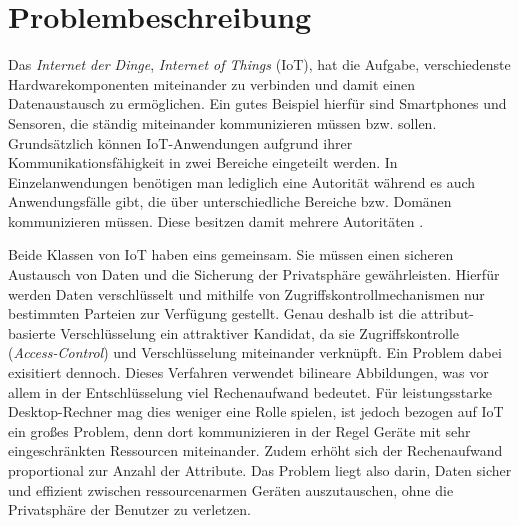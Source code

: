 \section{Problembeschreibung}
Das \textit{Internet der Dinge}, \textit{Internet of Things} (IoT), hat die
Aufgabe, verschiedenste Hardwarekomponenten miteinander zu verbinden und damit
einen Datenaustausch zu ermöglichen. Ein gutes Beispiel hierfür sind
Smartphones und Sensoren, die ständig miteinander kommunizieren müssen bzw.
sollen. Grundsätzlich können IoT-Anwendungen aufgrund ihrer
Kommunikationsfähigkeit in zwei Bereiche eingeteilt werden. In
Einzelanwendungen be\-nö\-ti\-gen man lediglich eine Autorität während es auch
Anwendungsfälle gibt, die über unterschiedliche Bereiche bzw. Domänen
kommunizieren müssen. Diese besitzen damit mehrere Autoritäten \cite{phoabe}.

Beide Klassen von IoT haben eins gemeinsam. Sie müssen einen sicheren Austausch
von Daten und die Sicherung der Privatsphäre gewährleisten. Hierfür werden
Daten verschlüsselt und mithilfe von Zugriffskontrollmechanismen nur
bestimmten Parteien zur Verfügung gestellt. Genau deshalb ist die
attribut-basierte Verschlüsselung ein attraktiver Kandidat, da sie
Zugriffskontrolle (\textit{Access-Control}) und Verschlüsselung miteinander
verknüpft. Ein Problem dabei exisitiert dennoch. Dieses Verfahren verwendet
bilineare Abbildungen, was vor allem in der Entschlüsselung viel Rechenaufwand
bedeutet. Für leistungsstarke Desktop-Rechner mag dies weniger eine Rolle
spielen, ist jedoch bezogen auf IoT ein großes Problem, denn dort
kommunizieren in der Regel Geräte mit sehr eingeschränkten Ressourcen
miteinander. Zudem erhöht sich der Rechenaufwand proportional zur Anzahl
der Attribute. Das Problem liegt also darin, Daten sicher und effizient
zwischen ressourcenarmen Geräten auszutauschen, ohne die Privatsphäre der
Benutzer zu verletzen.
